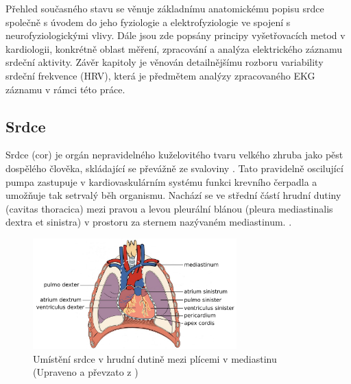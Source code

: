 Přehled současného stavu se věnuje základnímu anatomickému popisu srdce společně
s úvodem do jeho fyziologie a elektrofyziologie ve spojení s neurofyziologickými
vlivy. Dále jsou zde popsány principy vyšetřovacích metod v kardiologii,
konkrétně oblast měření, zpracování a analýza elektrického záznamu srdeční
aktivity. Závěr kapitoly je věnován detailnějšímu rozboru variability srdeční
frekvence (HRV), která je předmětem analýzy zpracovaného EKG záznamu v rámci
této práce.

\subsection{Srdce}
\label{section:heart}
Srdce (cor) je orgán nepravidelného kuželovitého tvaru velkého zhruba jako pěst
dospělého člověka, skládající se převážně ze svaloviny \cite{Memorix2017}. Tato
pravidelně oscilující pumpa zastupuje v kardiovaskulárním systému funkci
krevního čerpadla a umožňuje tak setrvalý běh organismu. Nachází se ve střední
částí hrudní dutiny (cavitas thoracica) mezi pravou a levou pleurální blánou
(pleura mediastinalis dextra et sinistra) v prostoru za sternem nazývaném
mediastinum. \cite{Weinhaus2005}.

\begin{figure}[h]
	\begin{center}
		\includegraphics[width=0.7\textwidth]{../assets/anatomy/mediastinum}
		\caption{Umístění srdce v hrudní dutině mezi plícemi v mediastinu
			(Upraveno a převzato z \cite{OpenStax})}
		\label{fig:mediastinum}
	\end{center}
\end{figure}

